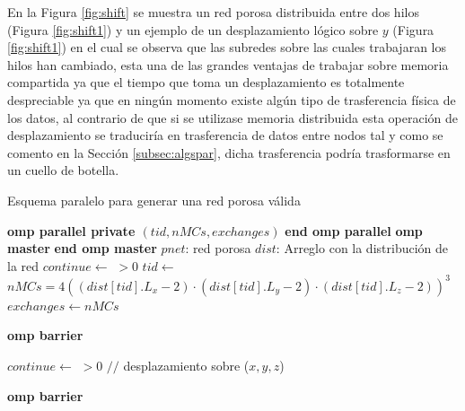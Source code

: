 En la Figura \ref{fig:shift} se muestra un red porosa distribuida entre dos hilos (Figura \ref{fig:shift1}) y un ejemplo de un desplazamiento lógico sobre $y$ (Figura \ref{fig:shift1}) en el cual se observa que las subredes sobre las cuales trabajaran los hilos han cambiado, esta una de las grandes ventajas de trabajar sobre memoria compartida ya que el tiempo que  toma un desplazamiento es totalmente despreciable ya que en ningún momento existe algún tipo de trasferencia física de los datos, al contrario de que si se utilizase memoria distribuida esta operación de desplazamiento se traduciría en trasferencia de datos entre nodos tal y como se comento en la Secci\'on \ref{subsec:algspar}, dicha trasferencia podría trasformarse en un cuello de botella.\\

\begin{algorithm}
\caption{Esquema paralelo para generar una red porosa válida}\label{alg:pvalidnet}
\begin{algorithmic}[1]
    {\textbf{omp parallel private $(tid,nMCs,exchanges)$}}
    {\textbf{end omp parallel}}    
    {\textbf{omp master}}
    {\textbf{end omp master}}
\Require $pnet$: red porosa
\Require $dist$: Arreglo con la distribución de la red
\State $continue \gets$  $ > 0$
\ompparallel
	\State $tid \gets $ 
	\State $nMCs=4(( dist[tid].L_x  - 2) \cdot (dist[tid].L_y - 2) \cdot (dist[tid].L_z - 2))^3$
		\State $exchanges \gets nMCs$
			\State {}
				\State {}
			\EndIf
		\EndWhile
		
		\State \textbf{omp barrier}
		
		\ompmaster
			\State $continue \gets$  $ > 0$		
				\State {} {$//$ desplazamiento sobre ($x,y,z$)}
			\EndIf
		\eompmaster

		\State \textbf{omp barrier}
	\EndWhile
\eompparallel
\end{algorithmic}
\end{algorithm}

